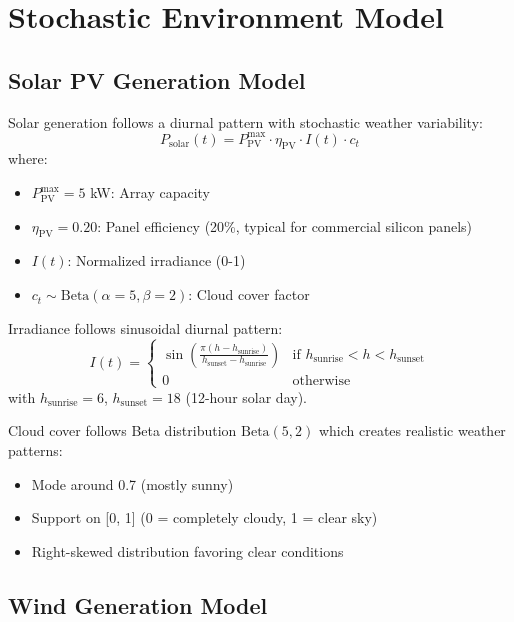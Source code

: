 \documentclass[11pt,a4paper]{article}
\begin{document}
\clearpage
\appendix

\section{Stochastic Environment Model}
\label{app:stochastic}

\subsection{Solar PV Generation Model}

Solar generation follows a diurnal pattern with stochastic weather variability:
\begin{equation}
P_{\text{solar}}(t) = P_{\text{PV}}^{\max} \cdot \eta_{\text{PV}} \cdot I(t) \cdot c_t
\end{equation}
where:
\begin{itemize}
    \item $P_{\text{PV}}^{\max} = 5$ kW: Array capacity
    \item $\eta_{\text{PV}} = 0.20$: Panel efficiency (20\%, typical for commercial silicon panels)
    \item $I(t)$: Normalized irradiance (0-1)
    \item $c_t \sim \text{Beta}(\alpha=5, \beta=2)$: Cloud cover factor
\end{itemize}

Irradiance follows sinusoidal diurnal pattern:
\begin{equation}
I(t) = \begin{cases}
\sin\left(\frac{\pi(h - h_{\text{sunrise}})}{h_{\text{sunset}} - h_{\text{sunrise}}}\right) & \text{if } h_{\text{sunrise}} < h < h_{\text{sunset}} \\
0 & \text{otherwise}
\end{cases}
\end{equation}
with $h_{\text{sunrise}} = 6$, $h_{\text{sunset}} = 18$ (12-hour solar day).

Cloud cover follows Beta distribution $\text{Beta}(5, 2)$ which creates realistic weather patterns:
\begin{itemize}
    \item Mode around 0.7 (mostly sunny)
    \item Support on [0, 1] (0 = completely cloudy, 1 = clear sky)
    \item Right-skewed distribution favoring clear conditions
\end{itemize}

\subsection{Wind Generation Model}
\end{document}
